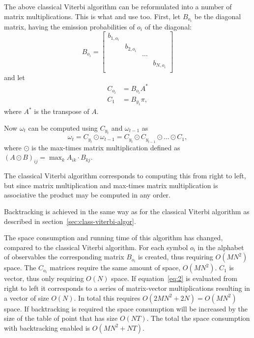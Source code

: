 The above classical Viterbi algorithm can be reformulated into a number of
matrix multiplications. This is what \citet{sand2013ziphmmlib} and
\citet{lifshits2009speeding} use too. First, let $B_{o_i}$ be the diagonal
matrix, having the emission probabilities of $o_i$ of the diagonal:
\begin{equation*}
  B_{o_i} =
  \begin{bmatrix}
    b_{1, o_i} &            &        &            \\
               & b_{2, o_i} &        &            \\
               &            & \cdots &            \\
               &            &        & b_{N, o_i} \\
  \end{bmatrix}
\end{equation*}
and let
\begin{align*}
  C_{o_i} &= B_{o_i} A^* \\
  C_1 &= B_{y_1} \pi,
\end{align*}
where $A^*$ is the transpose of $A$.

Now $\omega_t$ can be computed using $C_{y_t}$ and $\omega_{t - 1}$ as
\begin{equation}
  \label{eq:2}
  \omega_t = C_{y_t} \odot \omega_{t - 1} = C_{y_t} \odot C_{y_{t-1}} \odot
  \dots \odot C_1,
\end{equation}
where $\odot$ is the max-times matrix multiplication defined as ${(A \odot
  B)}_{ij} = \max_k A_{ik} \cdot B_{kj}$.

The classical Viterbi algorithm corresponds to computing this from right to
left, but since matrix multiplication and max-times matrix multiplication is
associative the product may be computed in any order.

Backtracking is achieved in the same way as for the classical Viterbi algorithm
as described in section~\ref{sec:class-viterbi-algor}.

The space consumption and running time of this algorithm has changed, compared
to the classical Viterbi algorithm. For each symbol $o_i$ in the alphabet of
observables the corresponding matrix $B_{o_i}$ is created, thus requiring
$O(M N^2)$ space. The $C_{o_i}$ matrices require the same amount of space,
$O(M N^2)$. $C_1$ is vector, thus only requiring $O(N)$ space. If
equation~\eqref{eq:2} is evaluated from right to left it corresponds to a
series of matrix-vector multiplications resulting in a vector of size
$O(N)$. In total this requires $O(2 M N^2 + 2 N) = O(M N^2)$ space. If
backtracking is required the space consumption will be increased by the size of
the table of point that has size $O(N T)$. The total the space consumption with
backtracking enabled is $O(M N^2 + N T)$.

